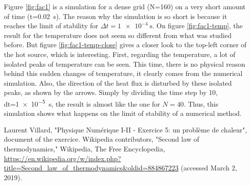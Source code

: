 \documentclass[a4paper,12pt,twoside]{article}
\begin{document}
Figure \ref{fig:fac1} is a simulation for a dense grid (N=160) on a very short amount of time (t=\SI{0.02}{\s}).
The reason why the simulation is so short is because it reaches the limit of stability for $\Delta t=\SI{1e-4}{\s}$.
On figure \ref{fig:fac1-temp}, the result for the temperature does not seem so different from what was studied before.
But figure \ref{fig:fac1-temp-close} gives a closer look to the top-left corner of the hot source, which is interesting.
First, regarding the temperature, a lot of isolated peaks of temperature can be seen.
This time, there is no physical reason behind this sudden changes of temperature, it clearly comes from the numerical simulation.
Also, the direction of the heat flux is disturbed by these isolated peaks, as shown by the arrows.
Simply by dividing the time step by \num{10}, dt=\SI{1e-5}{\s}, the result is almost like the one for $N=40$.
Thus, this simulation shows what happens on the limit of stability of a numerical method.

\begin{thebibliography}{99}
   Laurent Villard, "Physique Numérique I-II - Exercice 5: un problème de chaleur", document of the exercice.
   Wikipedia contributors, "Second law of thermodynamics," Wikipedia, The Free Encyclopedia, \url{https://en.wikipedia.org/w/index.php?title=Second_law_of_thermodynamics&oldid=884867223} (accessed March 2, 2019).


\end{thebibliography}
\end{document}
